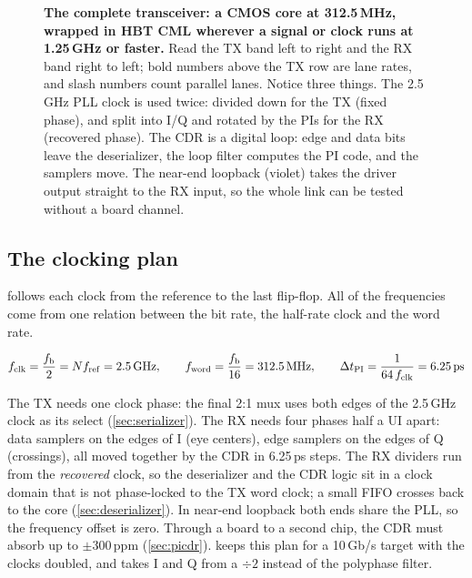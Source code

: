 \begin{figure}[!tb]
\centering

\caption{\textbf{The complete \OS{} transceiver: a CMOS core at 312.5\,MHz, wrapped in HBT CML wherever a signal or clock runs at 1.25\,GHz or faster.} Read the TX band left to right and the RX band right to left; bold numbers above the TX row are lane rates, and slash numbers count parallel lanes. Notice three things. The 2.5\,GHz PLL clock is used twice: divided down for the TX (fixed phase), and split into I/Q and rotated by the PIs for the RX (recovered phase). The CDR is a digital loop: edge and data bits leave the deserializer, the loop filter computes the PI code, and the samplers move. The near-end loopback (violet) takes the driver output straight to the RX input, so the whole link can be tested without a board channel.}
\label{fig:arch}
\end{figure}

\subsection{The clocking plan}\label{sec:ch14-clock}

 follows each clock from the reference to the last flip-flop. All of the frequencies come from one relation between the bit rate, the half-rate clock and the word rate.

\begin{keyeq}
\begin{equation}
  f_\mathrm{clk} = \frac{\fb}{2} = N f_\mathrm{ref} = \qty{2.5}{\giga\hertz},\qquad
  f_\mathrm{word} = \frac{\fb}{16} = \qty{312.5}{\mega\hertz},\qquad
  \Delta t_\mathrm{PI} = \frac{1}{64\,f_\mathrm{clk}} = \qty{6.25}{\pico\second}
  \label{eq:ch14-clk}
\end{equation}
\end{keyeq}

The TX needs one clock phase: the final 2:1 mux uses both edges of the 2.5\,GHz clock as its select (\cref{sec:serializer}). The RX needs four phases half a UI apart: data samplers on the edges of I (eye centers), edge samplers on the edges of Q (crossings), all moved together by the CDR in 6.25\,ps steps. The RX dividers run from the \emph{recovered} clock, so the deserializer and the CDR logic sit in a clock domain that is not phase-locked to the TX word clock; a small FIFO crosses back to the core (\cref{sec:deserializer}). In near-end loopback both ends share the PLL, so the frequency offset is zero. Through a board to a second chip, the CDR must absorb up to $\pm300$\,ppm (\cref{sec:picdr}).  keeps this plan for a 10\,Gb/s target with the clocks doubled, and takes I and Q from a $\div2$ instead of the polyphase filter.

